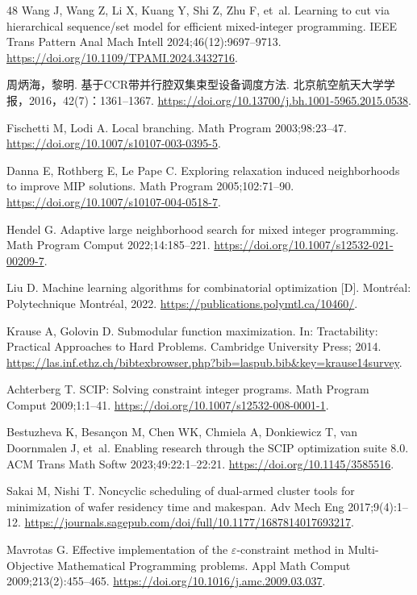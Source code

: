 \begin{thebibliography}{48}
Wang J, Wang Z, Li X, Kuang Y, Shi Z, Zhu F, et~al. Learning to cut via hierarchical sequence/set model for efficient mixed-integer programming.
IEEE Trans Pattern Anal Mach Intell 2024;46(12):9697--9713.
\url{https://doi.org/10.1109/TPAMI.2024.3432716}.

周炳海，黎明. 基于CCR带并行腔双集束型设备调度方法. 北京航空航天大学学报，2016，42(7)：1361--1367.
\url{https://doi.org/10.13700/j.bh.1001-5965.2015.0538}.

Fischetti M, Lodi A. Local branching.
Math Program 2003;98:23--47.
\url{https://doi.org/10.1007/s10107-003-0395-5}.

Danna E, Rothberg E, Le Pape C. Exploring relaxation induced neighborhoods to improve MIP solutions.
Math Program 2005;102:71--90.
\url{https://doi.org/10.1007/s10107-004-0518-7}.

Hendel G. Adaptive large neighborhood search for mixed integer programming.
Math Program Comput 2022;14:185--221.
\url{https://doi.org/10.1007/s12532-021-00209-7}.

Liu D. Machine learning algorithms for combinatorial optimization [D]. Montréal: Polytechnique Montréal, 2022.
\url{https://publications.polymtl.ca/10460/}.

Krause A, Golovin D. Submodular function maximization.
In: Tractability: Practical Approaches to Hard Problems. Cambridge University Press; 2014.
\url{https://las.inf.ethz.ch/bibtexbrowser.php?bib=laspub.bib\&key=krause14survey}.

Achterberg T. {SCIP}: Solving constraint integer programs.
Math Program Comput 2009;1:1--41.
\url{https://doi.org/10.1007/s12532-008-0001-1}.

Bestuzheva K, Besan{\c{c}}on M, Chen WK, Chmiela A, Donkiewicz T, van Doornmalen J, et~al. Enabling research through the {SCIP} optimization suite 8.0.
ACM Trans Math Softw 2023;49:22:1--22:21.
\url{https://doi.org/10.1145/3585516}.

Sakai M, Nishi T. Noncyclic scheduling of dual-armed cluster tools for minimization of wafer residency time and makespan.
Adv Mech Eng 2017;9(4):1--12.
\url{https://journals.sagepub.com/doi/full/10.1177/1687814017693217}.

Mavrotas G. Effective implementation of the $\varepsilon$-constraint method in Multi-Objective Mathematical Programming problems.
Appl Math Comput 2009;213(2):455--465.
\url{https://doi.org/10.1016/j.amc.2009.03.037}.


\end{thebibliography}
